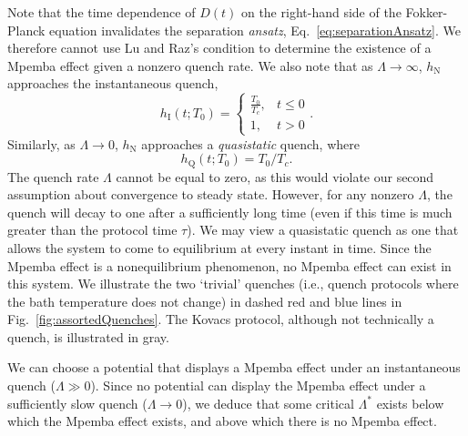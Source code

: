 \documentclass[hyperref={colorlinks=true, urlcolor=blue, citecolor=blue, final, bound}]{sfuthesis}
\begin{document}
Note that the time dependence of $D(t)$ on the right-hand side of the Fokker-Planck equation invalidates the separation \textit{ansatz}, Eq.~\ref{eq:separationAnsatz}. We therefore cannot use Lu and Raz's condition to determine the existence of a Mpemba effect given a nonzero quench rate. We also note that as $\Lambda\rightarrow\infty$, $h_{\mathrm{N}}$ approaches the instantaneous quench,
\begin{equation}
    h_{\mathrm{I}}(t;T_0) = \begin{cases}
        \frac{T_0}{T_c},& t \leq 0\\
        1,& t > 0
    \end{cases}.\label{eq:instantaneousQuench}
\end{equation}
Similarly, as $\Lambda\rightarrow 0$, $h_{\mathrm{N}}$ approaches a \textit{quasistatic} quench, where
\begin{equation}
    h_{\mathrm{Q}}(t;T_0) = T_0/T_c. \label{eq:quasistaticQuench}
\end{equation}
The quench rate $\Lambda$ cannot be equal to zero, as this would violate our second assumption about convergence to steady state. However, for any nonzero $\Lambda$, the quench will decay to one after a sufficiently long time (even if this time is much greater than the protocol time $\tau$). We may view a quasistatic quench as one that allows the system to come to equilibrium at every instant in time. Since the Mpemba effect is a nonequilibrium phenomenon, no Mpemba effect can exist in this system. We illustrate the two `trivial' quenches (i.e., quench protocols where the bath temperature does not change) in dashed red and blue lines in Fig.~\ref{fig:assortedQuenches}. The Kovacs protocol, although not technically a quench, is illustrated in gray.

We can choose a potential that displays a Mpemba effect under an instantaneous quench ($\Lambda \gg 0$). Since no potential can display the Mpemba effect under a sufficiently slow quench ($\Lambda \rightarrow 0$), we deduce that some critical $\Lambda^*$ exists below which the Mpemba effect exists, and above which there is no Mpemba effect. 
\end{document}
